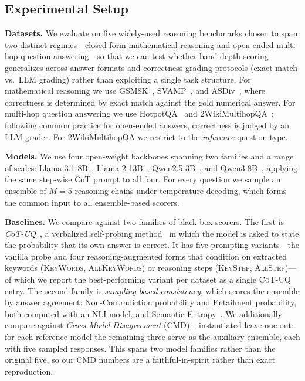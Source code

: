 \documentclass[twoside]{article}
\begin{document}
\subsection{Experimental Setup}
\label{sec:exp:setup}

\textbf{Datasets.} We evaluate on five widely-used reasoning benchmarks chosen to
span two distinct regimes---closed-form mathematical reasoning and open-ended
multi-hop question answering---so that we can test whether band-depth scoring
generalizes across answer formats and correctness-grading protocols (exact match
vs.\ LLM grading) rather than exploiting a single task structure.
For mathematical reasoning we use GSM8K~\citep{cobbe2021gsm8k},
SVAMP~\citep{patel2021svamp}, and ASDiv~\citep{miao2020asdiv}, where correctness
is determined by exact match against the gold numerical answer. For multi-hop
question answering we use HotpotQA~\citep{yang2018hotpotqa} and
2WikiMultihopQA~\citep{ho2020wikimultihop}; following common practice for
open-ended answers, correctness is judged by an LLM grader. For 2WikiMultihopQA
we restrict to the \emph{inference} question type.

\textbf{Models.} We use four open-weight backbones spanning two families and a
range of scales: Llama-3.1-8B~\citep{grattafiori2024llama3},
Llama-2-13B~\citep{touvron2023llama2},
Qwen2.5-3B~\citep{qwen2024qwen25}, and Qwen3-8B~\citep{qwen2025qwen3}, applying
the same step-wise CoT prompt to all
four. For every question we sample an ensemble of $M = 5$ reasoning chains under
temperature decoding, which forms the common input to all ensemble-based scorers.

\textbf{Baselines.} We compare against two families of black-box scorers. The
first is \emph{CoT-UQ}~\citep{zhang2025cotuq}, a verbalized self-probing
method~\citep{xiong2024llms} in which the model is asked to state the probability
that its own answer is correct. It has five prompting variants---the vanilla
probe and four reasoning-augmented forms that condition on extracted keywords
(\textsc{KeyWords}, \textsc{AllKeyWords}) or reasoning steps (\textsc{KeyStep},
\textsc{AllStep})---of which we report the best-performing variant per dataset as
a single \textsc{CoT-UQ} entry. The second family is
\emph{sampling-based consistency}, which scores the ensemble by answer agreement:
Non-Contradiction probability and Entailment probability, both computed with an
NLI model, and Semantic Entropy~\citep{kuhn2023semantic, farquhar2024detecting}.
We additionally compare against \emph{Cross-Model Disagreement}
(CMD)~\citep{hamidieh2026crossmodel}, instantiated leave-one-out: for each
reference model the remaining three serve as the auxiliary ensemble, each with five
sampled responses. This spans two model families rather than the original five, so
our CMD numbers are a faithful-in-spirit rather than exact reproduction.
\end{document}
